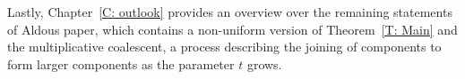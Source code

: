 Lastly, Chapter~\ref{C: outlook} provides an overview over the remaining statements of Aldous paper,
which contains a non-uniform version of Theorem~\ref{T: Main} and the multiplicative coalescent, 
a process describing the joining of components to form larger components as the parameter $t$ grows.

